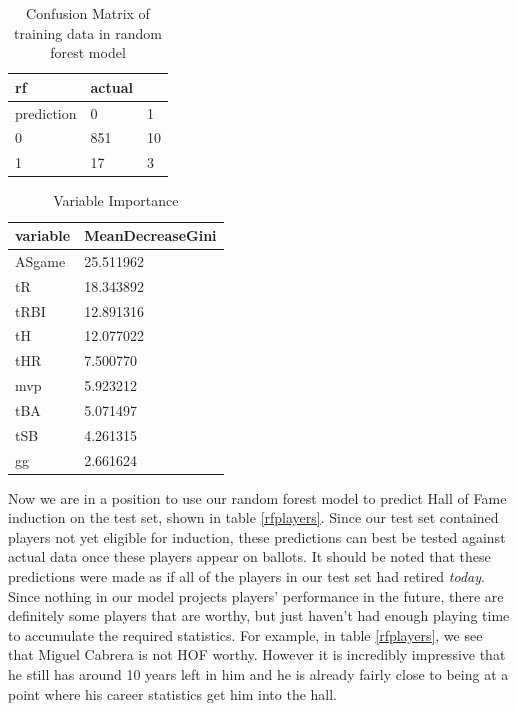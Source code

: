 \documentclass[preprint,12pt]{elsarticle}
\begin{document}
\begin{table}[h]
\centering
\begin{tabular}{|l |l l|}
\hline
 rf &  actual & \\
\hline
prediction & 0 & 1 \\
0 & 851 & 10 \\
1 & 17 & 3 \\
\hline
\end{tabular}
\caption{Confusion Matrix of training data in random forest model}
\label{rfconf}
\end{table}

\begin{table}[h]
\centering
\begin{tabular}{|l |l|}
\hline
 variable & MeanDecreaseGini\\
\hline
ASgame & 25.511962 \\
tR     & 18.343892 \\
tRBI   & 12.891316 \\
tH     & 12.077022 \\
tHR    &  7.500770 \\
mvp    &  5.923212 \\
tBA    &  5.071497 \\
tSB    &  4.261315 \\
gg     &  2.661624 \\
\hline
\end{tabular}
\caption{Variable Importance}
\label{varImp}
\end{table}

Now we are in a position to use our random forest model to predict Hall of Fame induction on the test set, shown in table \ref{rfplayers}. Since our test set contained players not yet eligible for induction, these predictions can best be tested against actual data once these players appear on ballots. It should be noted that these predictions were made as if all of the players in our test set had retired \textit{today}. Since nothing in our model projects players' performance in the future, there are definitely some players that are worthy, but just haven't had enough playing time to accumulate the required statistics. For example, in table \ref{rfplayers}, we see that Miguel Cabrera is not HOF worthy. However it is incredibly impressive that he still has around 10 years left in him and he is already fairly close to being at a point where his career statistics get him into the hall.
\end{document}
